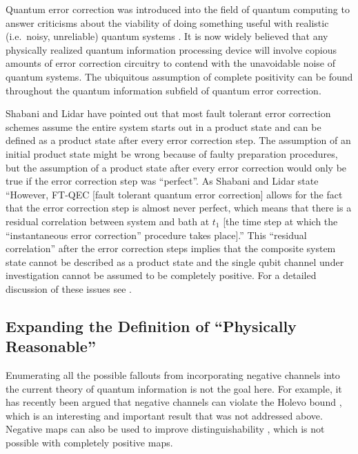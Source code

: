 Quantum error correction was introduced into the field of quantum computing to answer criticisms about the viability of doing something useful with realistic (i.e.\ noisy, unreliable) quantum systems \cite{Nielsen2010,Aharonov2008,Shabani2009}.  It is now widely believed that any physically realized quantum information processing device will involve copious amounts of error correction circuitry to contend with the unavoidable noise of quantum systems.  The ubiquitous assumption of complete positivity can be found throughout the quantum information subfield of quantum error correction.  

Shabani and Lidar \cite{Lidar2009} have pointed out that most fault tolerant error correction schemes assume the entire system starts out in a product state and can be defined as a product state after every error correction step.  The assumption of an initial product state might be wrong because of faulty preparation procedures, but the assumption of a product state after every error correction would only be true if the error correction step was ``perfect''.  As Shabani and Lidar state ``However, FT-QEC [fault tolerant quantum error correction] allows for the fact that the error correction step is almost never perfect, which means that there is a residual correlation between system and bath at $t_1$ [the time step at which the ``instantaneous error correction'' procedure takes place].'' \cite{Lidar2009}  This ``residual correlation'' after the error correction steps implies that the composite system state cannot be described as a product state and the single qubit channel under investigation cannot be assumed to be completely positive.  For a detailed discussion of these issues see \cite{Shabani2009}.  

\subsection{Expanding the Definition of ``Physically Reasonable''}

Enumerating all the possible fallouts from incorporating negative channels into the current theory of quantum information is not the goal here.  For example, it has recently been argued that negative channels can violate the Holevo bound \cite{Masillo2011}, which is an interesting and important result that was not addressed above.  Negative maps can also be used to improve distinguishability \cite{Carteret2008}, which is not possible with completely positive maps.  

